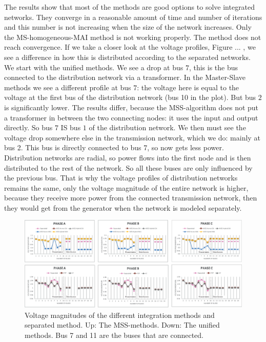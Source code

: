 \documentclass[10pt,journal]{article}
\begin{document}
\newpage
The results show that most of the methods are good options to solve integrated networks. They converge in a reasonable amount of time and number of iterations and this number is not increasing when the size of the network increases. Only the MS-homogeneous-MAI method is not working properly. The method does not reach convergence. If we take a closer look at the voltage profiles, Figure ... , we see a difference in how this is distributed according to the separated networks. We start with the unified methods. We see a drop at bus $7$, this is the bus connected to the distribution network via a transformer. In the Master-Slave methods we see a different profile at bus $7$: the voltage here is equal to the voltage at the first bus of the distribution network (bus 10 in the plot). But bus $2$ is significantly lower. The results differ, because the MSS-algorithm does not put a transformer in between the two connecting nodes: it uses the input and output directly. So bus $7$ IS bus $1$ of the distribution network. We then must see the voltage drop somewhere else in the transmission network, which we do: mainly at bus 2. This bus is directly connected to bus 7, so now gets less power. \\
Distribution networks are radial, so power flows into the first node and is then distributed to the rest of the network. So all these buses are only influenced by the previous bus. That is why the voltage profiles of distribution networks remains the same, only the voltage magnitude of the entire network is higher, because they receive more power from the connected transmission network, then they would get from the generator when the network is modeled separately. 
\begin{figure}[h!]
    \centering
    \includegraphics[width=\textwidth]{Images/Enumathpaper.eps}
    \caption{Voltage magnitudes of the different integration methods and separated method. Up: The MSS-methods. Down: The unified methods. Bus 7 and 11 are the buses that are connected.}
    \label{fig:voltmag}
\end{figure}
\end{document}
